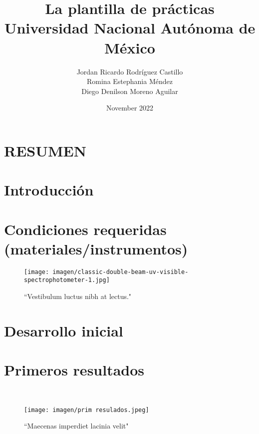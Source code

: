 \documentclass[letterpaper, 12px]{article}
\title{La plantilla de prácticas\\ Universidad Nacional Autónoma de México }
\author{Jordan Ricardo Rodríguez Castillo\\ Romina Estephania Méndez\\ Diego Denilson Moreno Aguilar}
\date{November 2022}
\begin{document}
\maketitle
\section{RESUMEN}
\begin{abstract}
    \lipsum[1-2]
\end{abstract}


\section*{Introducción}
 \lipsum[1]

\section*{Condiciones requeridas (materiales/instrumentos)}
 \lipsum[2-3]

 \begin{figure}[h]
    \centering
    \texttt{[image: imagen/classic-double-beam-uv-visible-spectrophotometer-1.jpg]}
    \caption{``Vestibulum luctus nibh at lectus."}
    \label{fig:nstrumento de medición }
\end{figure}

\section*{Desarrollo inicial}
 \lipsum[4-9]

\section*{Primeros resultados}
 \lipsum[10]\\

\begin{figure}[h!]
    \centering
    \texttt{[image: imagen/prim resulados.jpeg]}
    \caption*{``Maecenas imperdiet lacinia velit"}
    \label{fig:primeros resultados}
\end{figure}


 \lipsum[11-12]
\end{document}
